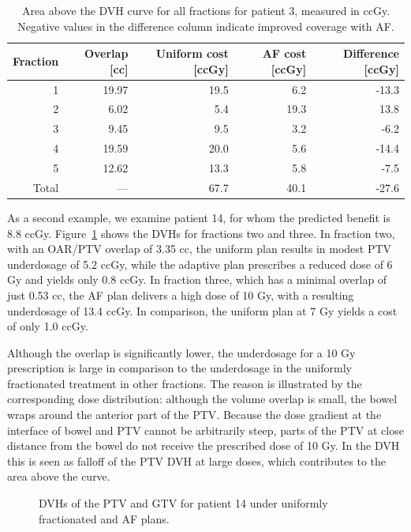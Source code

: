 \documentclass[11pt]{article}
\newcommand{\toprule}{\hline}
\newcommand{\midrule}{\hline}
\newcommand{\bottomrule}{\hline}
\begin{document}
\begin{table}[ht]
\centering
\caption{Area above the DVH curve for all fractions for patient 3, measured in ccGy. Negative values in the difference column indicate improved coverage with AF.}
\label{tab:patient3-replan}
\begin{tabular}{rrrrr}
\toprule
Fraction & Overlap [cc] & Uniform cost [ccGy] & AF cost [ccGy] & Difference [ccGy] \\
\midrule
1 & 19.97 & 19.5 & 6.2 & -13.3 \\
2 & 6.02 & 5.4 & 19.3 & 13.8 \\
3 & 9.45 & 9.5 & 3.2 & -6.2 \\
4 & 19.59 & 20.0 & 5.6 & -14.4 \\
5 & 12.62 & 13.3 & 5.8 & -7.5 \\
Total & --- & 67.7 & 40.1 & -27.6 \\
\bottomrule
\end{tabular}
\end{table}

As a second example, we examine patient 14, for whom the predicted benefit is 8.8 ccGy. Figure~\ref{fig:patient14-dvh} shows the DVHs for fractions two and three. In fraction two, with an OAR/PTV overlap of 3.35 cc, the uniform plan results in modest PTV underdosage of 5.2 ccGy, while the adaptive plan prescribes a reduced dose of 6 Gy and yields only 0.8 ccGy. In fraction three, which has a minimal overlap of just 0.53 cc, the AF plan delivers a high dose of 10 Gy, with a resulting underdosage of 13.4 ccGy. In comparison, the uniform plan at 7 Gy yields a cost of only 1.0 ccGy.

Although the overlap is significantly lower, the underdosage for a 10 Gy prescription is large in comparison to the underdosage in the uniformly fractionated treatment in other fractions. The reason is illustrated by the corresponding dose distribution: although the volume overlap is small, the bowel wraps around the anterior part of the PTV. Because the dose gradient at the interface of bowel and PTV cannot be arbitrarily steep, parts of the PTV at close distance from the bowel do not receive the prescribed dose of 10 Gy. In the DVH this is seen as falloff of the PTV DVH at large doses, which contributes to the area above the curve.

\begin{figure}[ht]
\centering
{}
\caption{DVHs of the PTV and GTV for patient 14 under uniformly fractionated and AF plans.}
\label{fig:patient14-dvh}
\end{figure}
\end{document}
